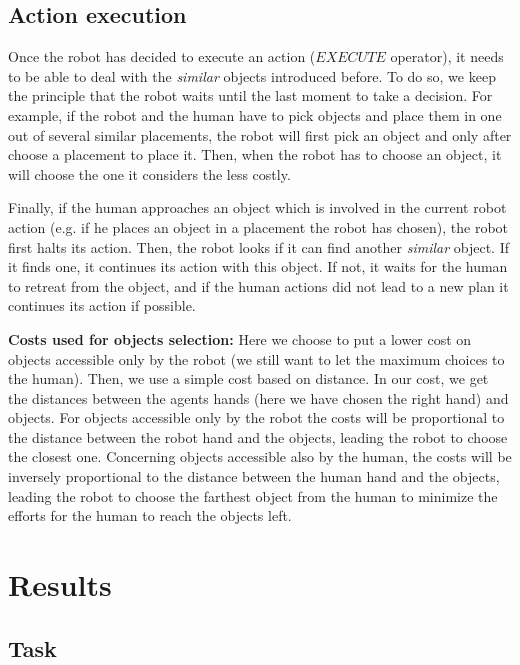 \documentclass[english,a4paper,11pt,twoside]{StyleThese}
\begin{document}
\subsection{Action execution}
\label{subsec:execution}

Once the robot has decided to execute an action ($EXECUTE$ operator), it needs to be able to deal with the \textit{similar} objects introduced before. To do so, we keep the principle that the robot waits until the last moment to take a decision. For example, if the robot and the human have to pick objects and place them in one out of several similar placements, the robot will first pick an object and only after choose a placement to place it. Then, when the robot has to choose an object, it will choose the one it considers the less costly.

Finally, if the human approaches an object which is involved in the current robot action (e.g. if he places an object in a placement the robot has chosen), the robot first halts its action. Then, the robot looks if it can find another \textit{similar} object. If it finds one, it continues its action with this object. If not, it waits for the human to retreat from the object, and if the human actions did not lead to a new plan it continues its action if possible.

\textbf{Costs used for objects selection:}
Here we choose to put a lower cost on objects accessible only by the robot (we still want to let the maximum choices to the human). Then, we use a simple cost based on distance. In our cost, we get the distances between the agents hands (here we have chosen the right hand) and objects. For objects accessible only by the robot the costs will be proportional to the distance between the robot hand and the objects, leading the robot to choose the closest one. Concerning objects accessible also by the human, the costs will be inversely proportional to the distance between the human hand and the objects, leading the robot to choose the farthest object from the human to minimize the efforts for the human to reach the objects left. 


\section{Results}

\subsection{Task}
\end{document}
